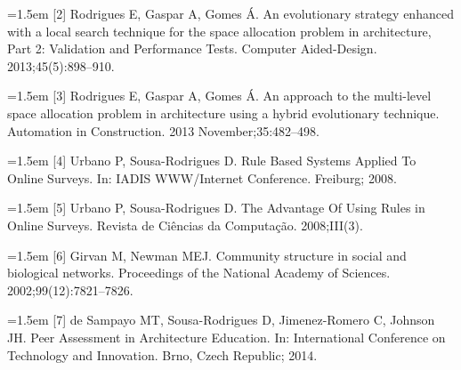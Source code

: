 \documentclass[]{scrartcl}
\begin{document}
\noindent\hangindent=1.5em
[2] Rodrigues E, Gaspar A, Gomes Á. An evolutionary strategy enhanced with a local search technique for the space allocation problem in architecture, Part 2: Validation and Performance Tests. Computer Aided-Design. 2013;45(5):898--910.

\noindent\hangindent=1.5em
[3] Rodrigues E, Gaspar A, Gomes Á. An approach to the multi-level space allocation problem in architecture using a hybrid evolutionary technique. Automation in Construction. 2013 November;35:482--498.

\noindent\hangindent=1.5em
[4] Urbano P, Sousa-Rodrigues D. Rule Based Systems Applied To Online Surveys. In: IADIS WWW/Internet Conference. Freiburg; 2008.

\noindent\hangindent=1.5em
[5] Urbano P, Sousa-Rodrigues D. The Advantage Of Using Rules in Online Surveys. Revista de Ciências da Computação. 2008;III(3).

\noindent\hangindent=1.5em
[6] Girvan M, Newman MEJ. Community structure in social and biological networks. Proceedings of the National Academy of Sciences. 2002;99(12):7821--7826.

\noindent\hangindent=1.5em
[7] de Sampayo MT, Sousa-Rodrigues D, Jimenez-Romero C, Johnson JH. Peer Assessment in Architecture Education. In: International Conference on Technology and Innovation. Brno, Czech Republic; 2014. 
\end{document}
